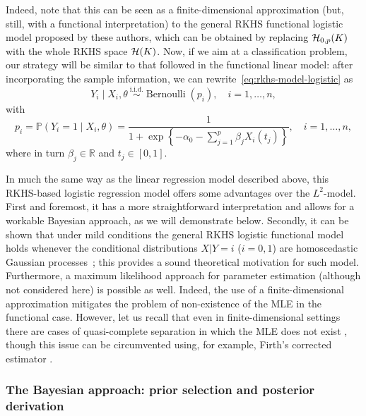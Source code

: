 \documentclass[ba]{imsart}
\numberwithin{equation}{section}
\theoremstyle{plain}
\newcommand{\R}{\mathbb{R}}
\newcommand{\Hcal}{\ensuremath\mathcal{H}}
\begin{document}
Indeed, note that this can be seen as a finite-dimensional approximation (but, still, with a functional interpretation) to the general RKHS functional logistic model proposed by these authors, which can be obtained by replacing \(\Hcal_{0,p}(K)\) with the whole RKHS space \(\Hcal(K)\). Now, if we aim at a classification problem, our strategy will be similar to that followed in the functional linear model: after incorporating the sample information, we can rewrite~\eqref{eq:rkhs-model-logistic} as
\begin{equation}\label{eq:rkhs-model-logistic-2}
Y_i \mid X_i,\theta \ \stackrel{\text{i.i.d.}}{\sim} \operatorname{Bernoulli}(p_i), \quad i=1,\dots, n,
\end{equation}
with
\begin{equation}\label{eq:rkhs-model-logistic-2-parameter}
  p_i = \mathbb P(Y_i=1 \mid X_i,\theta) = \frac{1}{\displaystyle 1 + \exp\left\{-\alpha_0 - \sum_{j=1}^p \beta_j X_i(t_j)\right\}}, \quad i=1,\dots, n,
\end{equation}
where in turn \(\beta_j\in\R\) and \(t_j\in[0, 1]\).

In much the same way as the linear regression model described above, this RKHS-based logistic regression model offers some advantages over the \(L^2\)-model. First and foremost, it has a more straightforward interpretation and allows for a workable Bayesian approach, as we will demonstrate below. Secondly, it can be shown that under mild conditions the general RKHS logistic functional model holds whenever the conditional distributions \(X | Y=i\) (\(i=0,1\)) are homoscedastic Gaussian processes~\citep[see Theorem 1 in][]{berrendero2018functional}; this provides a sound theoretical motivation for such model. Furthermore, a maximum likelihood approach for parameter estimation (although not considered here) is possible as well. Indeed, the use of a finite-dimensional approximation  mitigates the problem of non-existence of the MLE in the functional case. However, let us recall that even in finite-dimensional settings there are cases of quasi-complete separation in which the MLE does not exist \citep{albert1984existence}, though this issue can be circumvented using, for example, Firth's corrected estimator \citep{firth1993bias}.
\color{black}

\subsubsection{The Bayesian approach: prior selection and posterior derivation}
\end{document}
